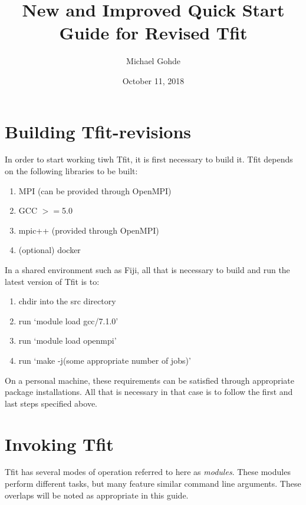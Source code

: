 \documentclass[12pt,letterpaper]{article}
\begin{document}
\title{New and Improved Quick Start Guide for Revised Tfit}
\author{Michael Gohde}
\date{October 11, 2018}
\maketitle


\section{Building Tfit-revisions}
In order to start working tiwh Tfit, it is first necessary to build it. Tfit depends on the following libraries to be built:

\begin{enumerate}
\item MPI (can be provided through OpenMPI)
\item GCC $>=$5.0
\item mpic++ (provided through OpenMPI)
\item (optional) docker
\end{enumerate}

In a shared environment such as Fiji, all that is necessary to build and run the latest version of Tfit is to:
\begin{enumerate}
\item chdir into the src directory
\item run `module load gcc/7.1.0'
\item run `module load openmpi'
\item run `make -j(some appropriate number of jobs)'
\end{enumerate}

On a personal machine, these requirements can be satisfied through appropriate package installations. All that is necessary in that case is to follow the first and last steps specified above.

\section{Invoking Tfit}
Tfit has several modes of operation referred to here as \textit{modules}. These modules perform different tasks, but many feature similar command line arguments. These overlaps will be noted as appropriate in this guide.
\end{document}
